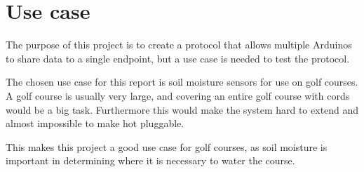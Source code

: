 \chapter{Use case}
The purpose of this project is to create a protocol that allows multiple Arduinos to share data to a single endpoint, but a use case is needed to test the protocol.

The chosen use case for this report is soil moisture sensors for use on golf courses. A golf course is usually very large, and covering an entire golf course with cords would be a big task. Furthermore this would make the system hard to extend and almost impossible to make hot pluggable.

This makes this project a good use case for golf courses, as soil moisture is important in determining where it is necessary to water the course.